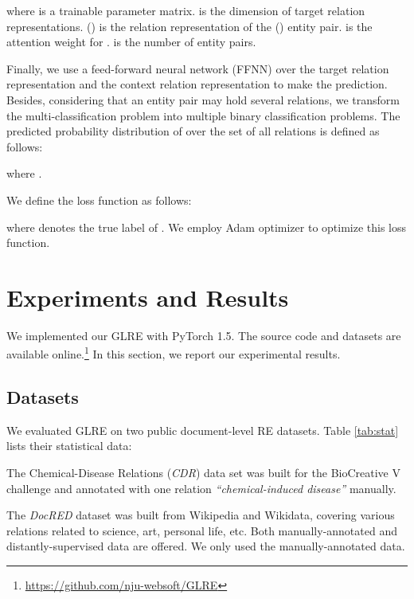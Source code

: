 \documentclass[11pt,a4paper]{article}
\begin{document}
where  is a trainable parameter matrix.  is the dimension of target relation representations.  () is the relation representation of the  () entity pair.  is the attention weight for .  is the number of entity pairs.

Finally, we use a feed-forward neural network (FFNN) over the target relation representation  and the context relation representation  to make the prediction. Besides, considering that an entity pair may hold several relations, we transform the multi-classification problem into multiple binary classification problems. The predicted probability distribution of  over the set  of all relations is defined as follows:

where .

We define the loss function as follows:

where  denotes the true label of . We employ Adam optimizer \cite{kingma2015adam} to optimize this loss function.
	
\section{Experiments and Results}
\label{sect:exp}

We implemented our GLRE with PyTorch 1.5. The source code and datasets are available online.\footnote{\url{https://github.com/nju-websoft/GLRE}} In this section, we report our experimental results.

\subsection{Datasets}

We evaluated GLRE on two public document-level RE datasets. Table \ref{tab:stat} lists their statistical data:
\begin{compactitem} 
\item The Chemical-Disease Relations (\emph{CDR}) data set \cite{li2016biocreative} was built for the BioCreative V challenge and annotated with one relation \textit{``chemical-induced disease''} manually.
	
\item The \emph{DocRED} dataset \cite{yao2019docred} was built from Wikipedia and Wikidata, covering various relations related to science, art, personal life, etc. Both manually-annotated and distantly-supervised data are offered. We only used the manually-annotated data.
\end{compactitem}
\end{document}

